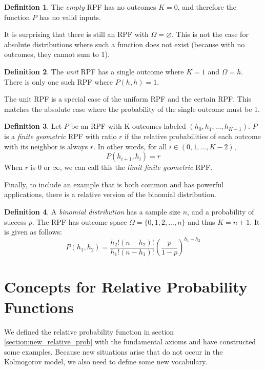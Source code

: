 \documentclass[twoside]{article}
\theoremstyle{plain}%
\theoremstyle{definition}
\newtheorem{definition}{Definition}[section]
\theoremstyle{remark}
\begin{document}
\begin{definition}
\label{def:empty_rpf}
The \textit{empty} RPF has no outcomes \(K = 0\), and therefore the function \(P\) has no valid inputs.
\end{definition}

It is surprising that there is still an RPF with \(\Omega = \varnothing\). This is not the case for absolute distributions where such a function does not exist (because with no outcomes, they cannot sum to 1).

\begin{definition}
\label{def:unit_rpf}
The \textit{unit} RPF has a single outcome where \(K = 1\) and \(\Omega = h\). There is only one such RPF where \(P(h, h) = 1\).
\end{definition}

The unit RPF is a special case of the uniform RPF and the certain RPF. This matches the absolute case where the probability of the single outcome must be 1.

\begin{definition}
\label{def:finite_geometric_rpf}
Let \(P\) be an RPF with K outcomes labeled \((h_0, h_1, ..., h_{K-1})\). \(P\) is a \textit{finite geometric} RPF with ratio \(r\) if the relative probabilities of each outcome with its neighbor is always \(r\). In other words, for all \(i \in (0, 1, ..., K-2)\),
\[P(h_{i+1}, h_i) = r\]
When \(r\) is 0 or \(\infty\), we can call this the \textit{limit finite geometric} RPF.
\end{definition}

Finally, to include an example that is both common and has powerful applications, there is a relative version of the binomial distribution.

\begin{definition}
\label{def:binomial_rpf}
A \textit{binomial distribution} has a sample size \(n\), and a probability of success \(p\). The RPF has outcome space \(\Omega = \{0, 1, 2, ..., n\}\) and thus \(K = n + 1\). It is given as follows:
\[P(h_1, h_2) = \frac{h_2!(n-h_2)!}{h_1!(n-h_1)!}\left(\frac{p}{1-p}\right)^{h_1 - h_2}\]
\end{definition}

\section{Concepts for Relative Probability Functions}

We defined the relative probability function in section \ref{section:new_relative_prob} with the fundamental axioms and have constructed some examples. Because new situations arise that do not occur in the Kolmogorov model, we also need to define some new vocabulary.
\end{document}
